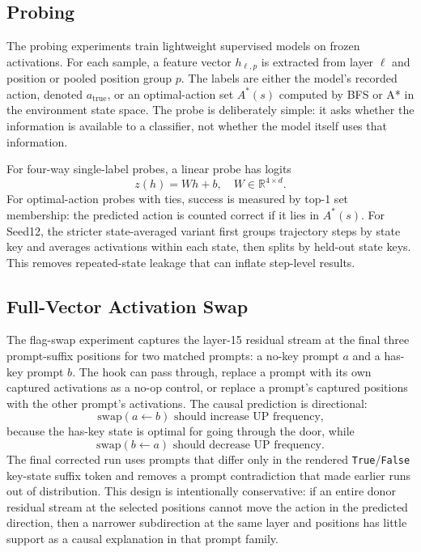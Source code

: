 \documentclass[11pt]{article}
\begin{document}
\subsection{Probing}

The probing experiments train lightweight supervised models on frozen activations.
For each sample, a feature vector $h_{\ell,p}$ is extracted from layer $\ell$ and position or pooled position group $p$.
The labels are either the model's recorded action, denoted $a_{\mathrm{true}}$, or an optimal-action set $A^*(s)$ computed by BFS or A* in the environment state space.
The probe is deliberately simple: it asks whether the information is available to a classifier, not whether the model itself uses that information.

For four-way single-label probes, a linear probe has logits
\[
  z(h) = W h + b,\quad W \in \mathbb{R}^{4 \times d}.
\]
For optimal-action probes with ties, success is measured by top-1 set membership: the predicted action is counted correct if it lies in $A^*(s)$.
For Seed12, the stricter state-averaged variant first groups trajectory steps by state key and averages activations within each state, then splits by held-out state keys.
This removes repeated-state leakage that can inflate step-level results.

\subsection{Full-Vector Activation Swap}

The flag-swap experiment captures the layer-15 residual stream at the final three prompt-suffix positions for two matched prompts:
a no-key prompt $a$ and a has-key prompt $b$.
The hook can pass through, replace a prompt with its own captured activations as a no-op control, or replace a prompt's captured positions with the other prompt's activations.
The causal prediction is directional:
\[
  \mathrm{swap}(a \leftarrow b) \text{ should increase UP frequency,}
\]
because the has-key state is optimal for going through the door, while
\[
  \mathrm{swap}(b \leftarrow a) \text{ should decrease UP frequency.}
\]
The final corrected run uses prompts that differ only in the rendered \texttt{True}/\texttt{False} key-state suffix token and removes a prompt contradiction that made earlier runs out of distribution.
This design is intentionally conservative: if an entire donor residual stream at the selected positions cannot move the action in the predicted direction, then a narrower subdirection at the same layer and positions has little support as a causal explanation in that prompt family.
\end{document}
